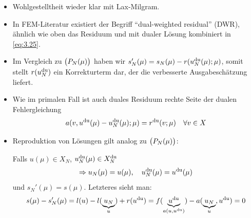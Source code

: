 \begin{bem} \beginwithlistbem
	\begin{itemize}
		\item Wohlgestelltheit wieder klar mit Lax-Milgram.
		\item In FEM-Literatur existiert der Begriff ``dual-weighted residual'' (DWR), ähnlich wie oben das Residuum und mit dualer Lösung kombiniert in \eqref{eq:3.25}.
		\item Im Vergleich zu $\big(P_N(\mu)\big)$ haben wir $s_N'(\mu) = s_N(\mu) - r(u_N^{\mathrm{du}}(\mu);\mu)$, somit stellt $r(u_N^{\mathrm{du}})$ ein Korrekturterm dar, der die verbesserte Ausgabeschätzung liefert.
		\item Wie im primalen Fall ist auch duales Residuum rechte Seite der dualen Fehlergleichung
			\[
				a(v,u^{\mathrm{du}}(\mu)-u_N^{\mathrm{du}}(\mu);\mu) = r^{\mathrm{du}}(v;\mu) \quad \forall v \in X
			\]
		\item Reproduktion von Lösungen gilt analog zu $\big(P_N(\mu)\big)$:

			Falls $u(\mu) \in X_N$, $u_N^{\mathrm{du}}(\mu) \in X_N^{\mathrm{du}}$
			\[
				\Rightarrow u_N(\mu) = u(\mu), \quad u_N^{\mathrm{du}}(\mu) = u^{\mathrm{du}}(\mu)
			\]
			und $s_N'(\mu) = s(\mu)$. Letzteres sieht man:
			\[
				s(\mu)-s_N'(\mu) = l(u) - l(\underbrace{u_N}_{u}) + r(u^{\mathrm{du}}) = f(\underbrace{u^{\mathrm{du}}}_{a(u,u^{\mathrm{du}})}) - a(\underbrace{u_N}_{u}, u^{\mathrm{du}}) = 0
			\]
	\end{itemize}
\end{bem}

